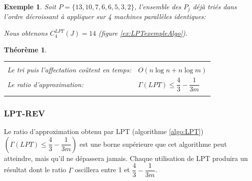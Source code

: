 \documentclass[a4paper,12pt]{report}
\theoremstyle{plain}				%
\newtheorem{theoreme}{Théorème}	%
\newtheorem{example}{Exemple}
\theoremstyle{definition}				%
\newcommand{\tdi}[1]{\todo[inline]{{#1}}{}}
\newcommand{\lcc}[1]{\todo[author=LCC,color=green,inline]{#1}}
\begin{document}
\begin{example}
Soit $P=\{13,10,7,6,6,5,3,2\}$, l'ensemble des $P_j$ déjà triés dans
l'ordre décroissant à appliquer sur 4 machines parallèles identiques:

Nous obtenons $C_4^{LPT}(J)=14$ (figure \ref{ex:LPTexempleAlgo}).
\end{example}

\begin{theoreme}
\begin{flushleft}
\begin{tabular}{|p{8cm}p{6cm}|}
\hline
& \\
Le tri puis l'affectation coûtent en temps:& $O(n \log n + n \log m)$
\\	%
Le ratio d'approximation:	&	$\Gamma(LPT)\leq \dfrac{4}{3} - \dfrac{1}{3m}$
\\
& \\
\hline
\end{tabular}
\end{flushleft}
\end{theoreme}


\subsubsection{LPT-REV} %

Le ratio d'approximation obtenu par LPT (algorithme \ref{algo:LPT})
$(\Gamma(LPT)\leq \dfrac{4}{3} - \dfrac{1}{3m})$ est une borne
supérieure que cet algorithme peut atteindre, mais qu'il ne dépassera
jamais.
Chaque utilisation de LPT produira un résultat dont le ratio $\Gamma$
oscillera entre 1 et $\dfrac{4}{3} - \dfrac{1}{3m}$.
\bigskip
\end{document}
